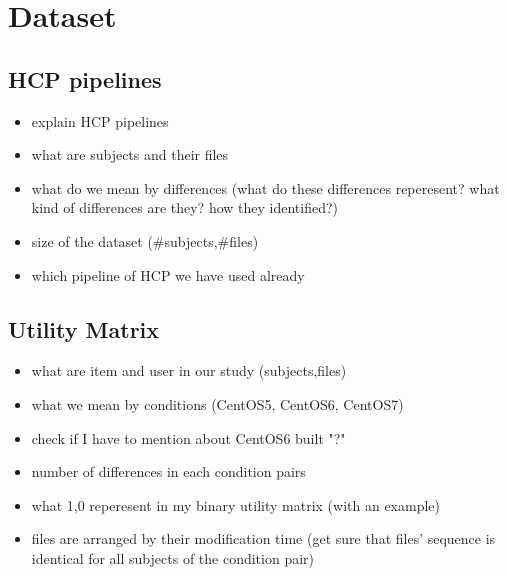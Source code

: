 \chapter{Dataset}
\section{HCP pipelines}
\begin{tcolorbox}
\begin{itemize}
\item explain HCP pipelines
\item what are subjects and their files 
\item what do we mean by differences (what do these differences reperesent? what kind of differences are they? how they identified?)
\item size of the dataset (\#subjects,\#files)
\item which pipeline of HCP we have used already
\end{itemize}
\end{tcolorbox}


\section{Utility Matrix}
\begin{tcolorbox}
\begin{itemize}
\item what are item and user in our study (subjects,files)
\item what we mean by conditions (CentOS5, CentOS6, CentOS7)
\item check if I have to mention about CentOS6 built "?" 
\item number of differences in each condition pairs
\item what 1,0 reperesent in my binary utility matrix (with an example)
\item files are arranged by their modification time (get sure that files' sequence is identical for all subjects of the condition pair) 
\end{itemize}
\end{tcolorbox}
